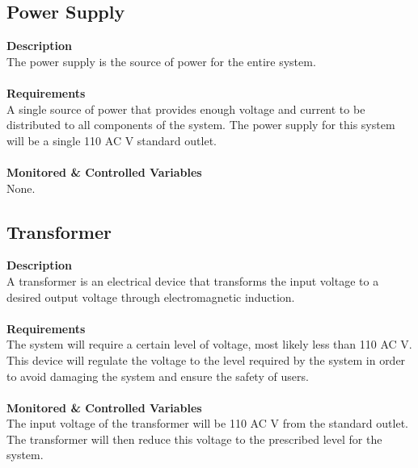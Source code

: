 \documentclass[titlepage]{article}
\begin{document}
\begin{center}
\begin{center}
\begin{center}
\begin{center}
\begin{center}
\begin{center}
\begin{center}
\begin{center}
\begin{center}
\begin{center}
\begin{center}
\begin{center}
\begin{center}
\begin{center}
\begin{center}
\begin{center}
\begin{center}
\begin{center}
\begin{center}
\begin{center}
\subsection{Power Supply}
\textbf{Description}\\
The power supply is the source of power for the entire system.\\\\
\textbf{Requirements}\\
A single source of power that provides enough voltage and current to be distributed to all components of the system. The power supply for this system will be a single 110 AC V standard outlet.\\\\
\textbf{Monitored \& Controlled Variables}\\
None.

\newpage
\subsection{Transformer}
\textbf{Description}\\
A transformer is an electrical device that transforms the input voltage to a desired output voltage through electromagnetic induction.\\\\
\textbf{Requirements}\\
The system will require a certain level of voltage, most likely less than 110 AC V. This device will regulate the voltage to the level required by the system in order to avoid damaging the system and ensure the safety of users.\\\\
\textbf{Monitored \& Controlled Variables}\\
The input voltage of the transformer will be 110 AC V from the standard outlet. The transformer will then reduce this voltage to the prescribed level for the system.


\end{center}
\end{center}
\end{center}
\end{center}
\end{center}
\end{center}
\end{center}
\end{center}
\end{center}
\end{center}
\end{center}
\end{center}
\end{center}
\end{center}
\end{center}
\end{center}
\end{center}
\end{center}
\end{center}
\end{center}
\end{document}

